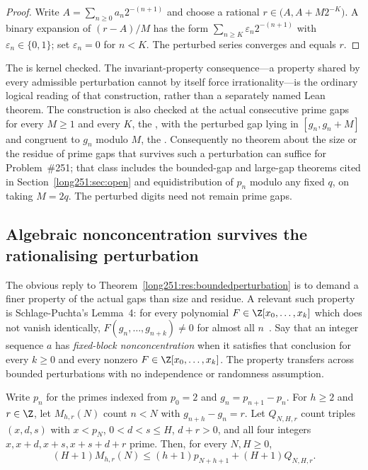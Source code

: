 \begin{proof}
Write $A=\sum_{n\ge0}a_n2^{-(n+1)}$ and choose a rational
$r\in\bigl(A,A+M2^{-K}\bigr)$.  A binary expansion of $(r-A)/M$ has the form
$\sum_{n\ge K}\varepsilon_n2^{-(n+1)}$ with $\varepsilon_n\in\{0,1\}$; set
$\varepsilon_n=0$ for $n<K$.  The perturbed series converges and equals $r$.
\end{proof}

\noindent The
is kernel checked.  The invariant-property consequence---a property shared by
every admissible perturbation cannot by itself force irrationality---is the
ordinary logical reading of that construction, rather than a separately named
Lean theorem.  The construction is also
checked at the actual consecutive prime gaps for every $M\ge1$ and every $K$,
the
, with the perturbed gap lying in $[g_n,g_n+M]$ and
congruent to $g_n$ modulo $M$, the
.  Consequently no theorem about the size or the residue of prime gaps
that survives such a perturbation can suffice for Problem~\#251; that class
includes the bounded-gap and large-gap theorems cited in
Section~\ref{long251:sec:open} and equidistribution of $p_n$ modulo any fixed $q$, on
taking $M=2q$.  The perturbed digits need not remain prime gaps.

\subsection{Algebraic nonconcentration survives the rationalising perturbation}

The obvious reply to Theorem~\ref{long251:res:boundedperturbation} is to demand a
finer property of the actual gaps than size and residue.  A relevant such
property is Schlage-Puchta's Lemma~4: for every polynomial
$F\in\Z[x_0,\ldots,x_k]$ which does not vanish identically,
$F(g_n,\ldots,g_{n+k})\ne0$ for almost all $n$~\cite[Lemma~4,
pp.~5--6]{schlagepuchta2011}.  Say that an integer sequence $a$ has
\emph{fixed-block nonconcentration} when it satisfies that conclusion for
every $k\ge0$ and every nonzero $F\in\Z[x_0,\ldots,x_k]$.  The property
transfers across bounded perturbations with no independence or randomness
assumption.


\begin{proposition}\label{long251:res:shiftedcount}
Write $p_n$ for the primes indexed from $p_0=2$ and $g_n=p_{n+1}-p_n$.
For $h\ge2$ and $r\in\Z$, let $M_{h,r}(N)$ count $n<N$ with $g_{n+h}-g_n=r$.
Let $Q_{N,H,r}$ count triples $(x,d,s)$ with $x<p_N$,
$0<d<s\le H$, $d+r>0$, and all four integers
$x,x+d,x+s,x+s+d+r$ prime. Then, for every $N,H\ge0$,
\[
 (H+1)M_{h,r}(N)\le
 (h+1)p_{N+h+1}+(H+1)Q_{N,H,r}.
\]
\end{proposition}

